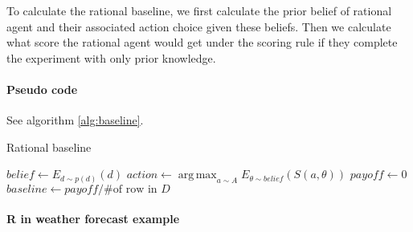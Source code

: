 \documentclass{article}
\DeclareMathOperator*{\argmax}{arg\,max}
\begin{document}
To calculate the rational baseline, we first calculate the prior belief of rational agent and their associated action choice given these beliefs. Then we calculate what score the rational agent would get under the scoring rule if they complete the experiment with only prior knowledge.

\paragraph{Pseudo code} 
See algorithm \ref{alg:baseline}.

\begin{algorithm}[!h]
\caption{Rational baseline}\label{alg:baseline}
$belief \gets E_{d\sim p(d)}(d)$\;
$action \gets \argmax_{a \sim A}{E_{\theta \sim belief}(S(a, \theta))}$\;
$payoff \gets 0$\;
$baseline \gets payoff / \text{\# of row in }D$\;
\end{algorithm}

\paragraph{R in weather forecast example}
\end{document}
